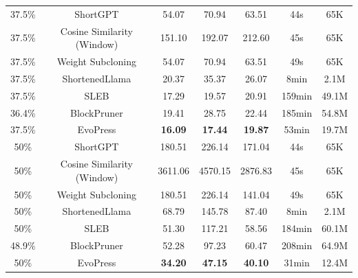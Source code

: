 \begin{table}[ht]
\begin{tabular}{cc|ccc|cc}
\midrule
37.5\% & ShortGPT                         & 54.07 & 70.94 & 63.51 & 44s    & 65K    \\
37.5\% & Cosine Similarity (Window)         & 151.10 & 192.07 & 212.60 & 45s   & 65K    \\
37.5\% & Weight Subcloning               & 54.07 & 70.94 & 63.51 & 49s    & 65K    \\
37.5\% & ShortenedLlama                  & 20.37 & 35.37 & 26.07 & 8min   & 2.1M   \\
37.5\% & SLEB                             & 17.29 & 19.57 & 20.91 & 159min & 49.1M  \\
36.4\% & BlockPruner                     & 19.41 & 28.75 & 22.44 & 185min & 54.8M  \\
37.5\% & EvoPress                         & \bf{16.09} & \bf{17.44} & \bf{19.87} & 53min  & 19.7M  \\
\midrule
50\%   & ShortGPT                         & 180.51 & 226.14 & 171.04 & 44s    & 65K    \\
50\%   & Cosine Similarity (Window)         & 3611.06 & 4570.15 & 2876.83 & 45s   & 65K    \\
50\%   & Weight Subcloning               & 180.51 & 226.14 & 141.04 & 49s    & 65K    \\
50\%   & ShortenedLlama                  & 68.79  & 145.78 & 87.40  & 8min   & 2.1M   \\
50\%   & SLEB                             & 51.30  & 117.21 & 58.56  & 184min & 60.1M  \\
48.9\% & BlockPruner                     & 52.28  & 97.23  & 60.47  & 208min & 64.9M  \\
50\%   & EvoPress                         & \bf{34.20}  & \bf{47.15}  & \bf{40.10}  & 31min  & 12.4M  \\
\bottomrule
\end{tabular}
\end{table}
